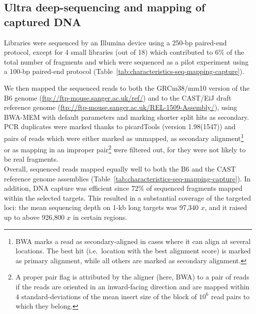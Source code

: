 



\subsection{Ultra deep-sequencing and mapping of captured DNA}

Libraries were sequenced by an Illumina device using a 250-bp paired-end protocol, except for 4 small libraries (out of 18) which contributed to 6\% of the total number of fragments and which were sequenced as a pilot experiment using a 100-bp paired-end protocol (Table~\ref{tab:characteristics-seq-mapping-capture}). 

We then mapped the sequenced reads to both the GRCm38/mm10 version of the B6 genome (\url{ftp://ftp-mouse.sanger.ac.uk/ref/}) and to the CAST/EiJ draft reference genome (\url{ftp://ftp-mouse.sanger.ac.uk/REL-1509-Assembly/}), using BWA-MEM \citep{li2009fast, li2013aligning} with default parameters and marking shorter split hits as secondary.
PCR duplicates were marked thanks to picardTools (version 1.98(1547)) \citep{picard2018toolkit} and pairs of reads which were either marked as unmapped, as secondary alignment\footnote{BWA marks a read as secondary-aligned in cases where it can align at several locations. The best hit (i.e.\ location with the best alignment score) is marked as primary alignment, while all others are marked as secondary alignment.} or as mapping in an improper pair\footnote{A proper pair flag is attributed by the aligner (here, BWA) to a pair of reads if the reads are oriented in an inward-facing direction and are mapped within 4 standard-deviations of the mean insert size of the block of $10^6$ read pairs to which they belong.} were filtered out, for they were not likely to be real fragments.\\

Overall, sequenced reads mapped equally well to both the B6 and the CAST reference genome assemblies (Table~\ref{tab:characteristics-seq-mapping-capture}).
In addition, DNA capture was efficient since 72\% of sequenced fragments mapped within the selected targets.
This resulted in a substantial coverage of the targeted loci: the mean sequencing depth on 1-kb long targets was 97,340 $x$, and it raised up to above 926,800 $x$ in certain regions.

